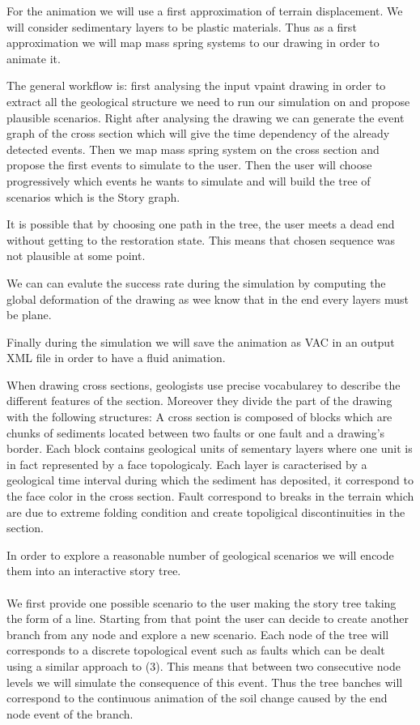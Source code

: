 \documentclass[12pt, a4paper]{memoir} %
\begin{document}
For the animation we will use a first approximation of terrain displacement. We will consider sedimentary layers to be plastic materials. Thus as a first approximation we will map mass spring systems to our drawing in order to animate it.

The general workflow is: first analysing the input vpaint drawing in order to extract all the geological structure we need to run our simulation on and propose plausible scenarios. 
Right after analysing the drawing we can generate the event graph of the cross section which will give the time dependency of the already detected events.
Then we map mass spring system on the cross section and propose the first events to simulate to the user.
Then the user will choose progressively which events he wants to simulate and will build the tree of scenarios which is the Story graph. 

It is possible that by choosing one path in the tree, the user meets a dead end without getting to the restoration state. This means that chosen sequence was not plausible at some point.

We can can evalute the success rate during the simulation by computing the global deformation of the drawing as wee know that in the end every layers must be plane.

Finally during the simulation we will save the animation as VAC in an output XML file in order to have a fluid animation.


When drawing cross sections, geologists use precise vocabularey to describe the different features of the section.
Moreover they divide the part of the drawing with the following structures: 
A cross section is composed of blocks which are chunks of sediments located between two faults or one fault and a drawing's border. Each block contains geological units of sementary layers where one unit is in fact represented by a face topologicaly. Each layer is caracterised by a geological time interval during which the sediment has deposited, it correspond to the face color in the cross section. Fault correspond to breaks in the terrain which are due to extreme folding condition and create topoligical discontinuities in the section.

 In order to explore a reasonable number of geological scenarios we will encode them into an interactive story tree.\\\\

We first provide one possible scenario to the user making the story tree taking the form of a line. Starting from that point the user can decide to create another branch from any node and explore a new scenario. Each node of the tree will corresponds to a discrete topological event such as faults which can be dealt using a similar approach to (3). This means that between two consecutive node levels we will simulate the consequence of this event. Thus the tree banches will correspond to the continuous animation of the soil change caused by the end node event of the branch.\\\\
\end{document}
